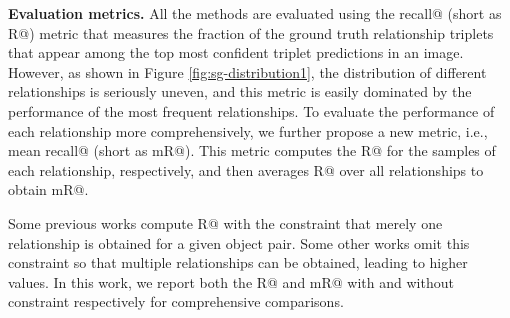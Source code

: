 \documentclass[10pt,twocolumn,letterpaper]{article}
\begin{document}
\noindent\textbf{Evaluation metrics. }
All the methods are evaluated using the recall@ (short as R@) metric that measures the fraction of the ground truth relationship triplets that appear among the top  most confident triplet predictions in an image. However, as shown in Figure \ref{fig:sg-distribution1}, the distribution of different relationships is seriously uneven, and this metric is easily dominated by the performance of the most frequent relationships. To evaluate the performance of each relationship more comprehensively, we further propose a new metric, i.e., mean recall@ (short as mR@). This metric computes the R@ for the samples of each relationship, respectively, and then averages R@ over all relationships to obtain mR@.  

Some previous works \cite{xu2017scene} compute R@ with the constraint that merely one relationship is obtained for a given object pair. Some other works \cite{newell2017pixels} omit this constraint so that multiple relationships can be obtained, leading to higher values. In this work, we report both the R@ and mR@ with and without constraint respectively for comprehensive comparisons. 
\end{document}
